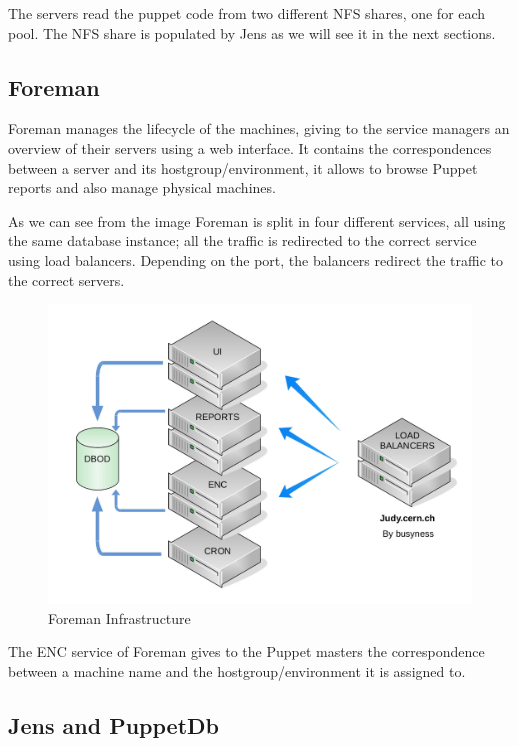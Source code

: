 The servers read the puppet code from two different NFS shares, one for
each pool. The NFS share is populated by Jens as we will see it in the
next sections.

\subsection{Foreman}

Foreman manages the lifecycle of the machines, giving to the service
managers an overview of their servers using a web interface. It contains
the correspondences between a server and its hostgroup/environment, it
allows to browse Puppet reports and also manage physical machines.

As we can see from the image Foreman is split in four different services,
all using the same database instance; all the traffic is redirected to the
correct service using load balancers. Depending on the port, the balancers
redirect the traffic to the correct servers.

\begin{figure}[H]
\includegraphics[width=\textwidth,height=\textheight,keepaspectratio]{ConfigurationManagement/Infrastructure_judy.jpg}
\caption{Foreman Infrastructure}
\end{figure}

The ENC service of Foreman gives to the Puppet masters the correspondence
between a machine name and the hostgroup/environment it is assigned to.


\subsection{Jens and PuppetDb}

